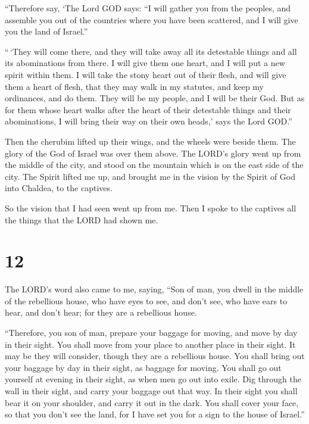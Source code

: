  ``Therefore say, `The Lord GOD says: ``I will gather you
from the peoples, and assemble you out of the countries where you have
been scattered, and I will give you the land of Israel.''

 ``\,`They will come there, and they will take away all its
detestable things and all its abominations from there.  I
will give them one heart, and I will put a new spirit within them. I
will take the stony heart out of their flesh, and will give them a heart
of flesh,  that they may walk in my statutes, and keep my
ordinances, and do them. They will be my people, and I will be their
God.  But as for them whose heart walks after the heart of
their detestable things and their abominations, I will bring their way
on their own heads,' says the Lord GOD.''

 Then the cherubim lifted up their wings, and the wheels
were beside them. The glory of the God of Israel was over them above.
 The LORD's glory went up from the middle of the city, and
stood on the mountain which is on the east side of the city.
 The Spirit lifted me up, and brought me in the vision by
the Spirit of God into Chaldea, to the captives.

So the vision that I had seen went up from me.  Then I
spoke to the captives all the things that the LORD had shown me.

\hypertarget{section-10}{%
\section{12}\label{section-10}}

 The LORD's word also came to me, saying,  ``Son
of man, you dwell in the middle of the rebellious house, who have eyes
to see, and don't see, who have ears to hear, and don't hear; for they
are a rebellious house.

 ``Therefore, you son of man, prepare your baggage for
moving, and move by day in their sight. You shall move from your place
to another place in their sight. It may be they will consider, though
they are a rebellious house.  You shall bring out your
baggage by day in their sight, as baggage for moving. You shall go out
yourself at evening in their sight, as when men go out into exile.
 Dig through the wall in their sight, and carry your baggage
out that way.  In their sight you shall bear it on your
shoulder, and carry it out in the dark. You shall cover your face, so
that you don't see the land, for I have set you for a sign to the house
of Israel.''


